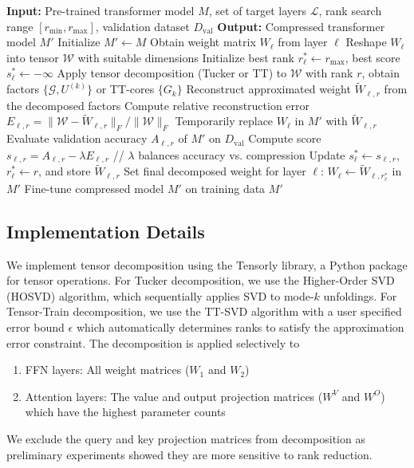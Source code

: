 \documentclass[conference]{IEEEtran}
\begin{document}
\begin{algorithm}[htbp]
\caption{Selective Tensor Rank Reduction for Transformer Layers}
\label{alg:rank-selection}
\begin{algorithmic}[1]
\STATE \textbf{Input:} Pre-trained transformer model $M$, set of target layers $\mathcal{L}$, rank search range $[r_{\min}, r_{\max}]$, validation dataset $D_{\text{val}}$
\STATE \textbf{Output:} Compressed transformer model $M'$
\STATE 
\STATE Initialize $M' \leftarrow M$
    \STATE Obtain weight matrix $W_\ell$ from layer $\ell$
    \STATE Reshape $W_\ell$ into tensor $\mathcal{W}$ with suitable dimensions
    \STATE Initialize best rank $r_\ell^* \leftarrow r_{\max}$, best score $s_\ell^* \leftarrow -\infty$
        \STATE Apply tensor decomposition (Tucker or TT) to $\mathcal{W}$ with rank $r$, obtain factors $\{\mathcal{G}, U^{(k)}\}$ or TT-cores $\{G_k\}$
        \STATE Reconstruct approximated weight $\tilde{W}_{\ell,r}$ from the decomposed factors
        \STATE Compute relative reconstruction error
        \STATE \quad $E_{\ell,r} = \|\mathcal{W} - \tilde{W}_{\ell,r}\|_F / \|\mathcal{W}\|_F$
        \STATE Temporarily replace $W_\ell$ in $M'$ with $\tilde{W}_{\ell,r}$
        \STATE Evaluate validation accuracy $A_{\ell,r}$ of $M'$ on $D_{\text{val}}$
        \STATE Compute score
        \STATE \quad $s_{\ell,r} = A_{\ell,r} - \lambda E_{\ell,r}$ \quad // $\lambda$ balances accuracy vs. compression
            \STATE Update $s_\ell^* \leftarrow s_{\ell,r}$, $r_\ell^* \leftarrow r$, and store $\tilde{W}_{\ell,r}$
        \ENDIF
    \ENDFOR
    \STATE Set final decomposed weight for layer $\ell$: $W_\ell \leftarrow \tilde{W}_{\ell,r_\ell^*}$ in $M'$
\ENDFOR
\STATE Fine-tune compressed model $M'$ on training data
\RETURN $M'$
\end{algorithmic}
\end{algorithm}


\subsection{Implementation Details}
We implement tensor decomposition using the Tensorly library, a Python package for tensor operations. For Tucker decomposition,
we use the Higher-Order SVD (HOSVD) algorithm, which sequentially applies SVD to mode-$k$ unfoldings. For Tensor-Train decomposition,
we use the TT-SVD algorithm with a user specified error bound $\epsilon$ which automatically determines ranks to satisfy the
approximation error constraint. The decomposition is applied selectively to
\begin{enumerate}
    \item FFN layers: All weight matrices ($W_1$ and $W_2$)
    \item Attention layers: The value and output projection matrices ($W^V$ and $W^O$) which have the highest parameter counts
\end{enumerate}
We exclude the query and key projection matrices from decomposition as preliminary experiments showed they are more sensitive to
rank reduction.
\end{document}

